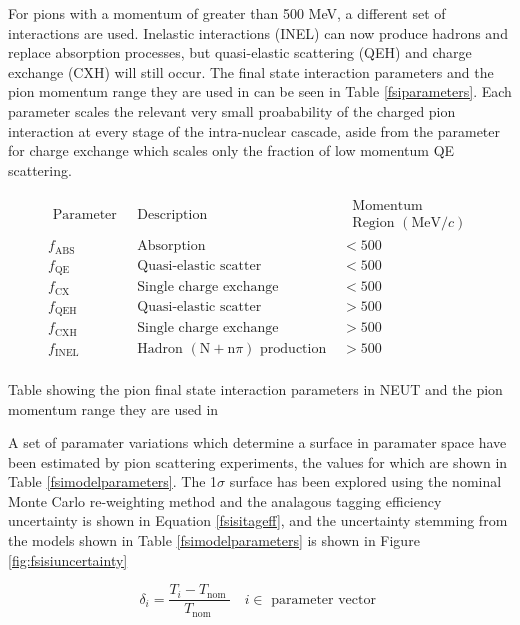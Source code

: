 For pions with a momentum of greater than 500 MeV, a different set of interactions are used. Inelastic interactions (INEL) can now produce hadrons and replace absorption processes, but quasi-elastic scattering (QEH) and charge exchange (CXH) will still occur. The final state interaction parameters and the pion momentum range they are used in can be seen in Table \ref{fsiparameters}. Each parameter scales the relevant very small proabability of the charged pion interaction at every stage of the intra-nuclear cascade, aside from the parameter for charge exchange which scales only the fraction of low momentum QE scattering. 


\begin{table}[H]
$$
\begin{array}{ccc}
\text { Parameter } & \text { Description } & \begin{array}{c}
\text { Momentum } \\
\text { Region }(\mathrm{MeV} / c)
\end{array} \\
f_{\mathrm{ABS}} & \text { Absorption } & <500 \\
f_{\mathrm{QE}} & \text { Quasi-elastic scatter } & <500 \\
f_{\mathrm{CX}} & \text { Single charge exchange } & <500 \\
f_{\mathrm{QEH}} & \text { Quasi-elastic scatter } & >500 \\
f_{\mathrm{CXH}} & \text { Single charge exchange } & >500 \\
f_{\mathrm{INEL}} & \text { Hadron }(\mathrm{N}+\mathrm{n} \pi) \text { production } & >500 \\
\end{array}
$$
\caption{Table showing the pion final state interaction parameters in NEUT and the pion momentum range they are used in}
\label{fsiparameters}
\end{table}
A set of paramater variations which determine a surface in paramater space have been estimated by pion scattering experiments, the values for which are shown in Table \ref{fsimodelparameters}. The 1$\sigma$ surface has been explored using the nominal Monte Carlo re-weighting method and the analagous tagging efficiency uncertainty is shown in Equation \ref{fsisitageff}, and the uncertainty stemming from the models shown in Table \ref{fsimodelparameters} is shown in Figure \ref{fig:fsisiuncertainty}

\begin{equation}
\delta_{i}=\frac{T_{i}-T_{\text {nom }}}{T_{\text {nom }}} \quad i \in \text { parameter vector }
\label{fsisitageff}
\end{equation}

